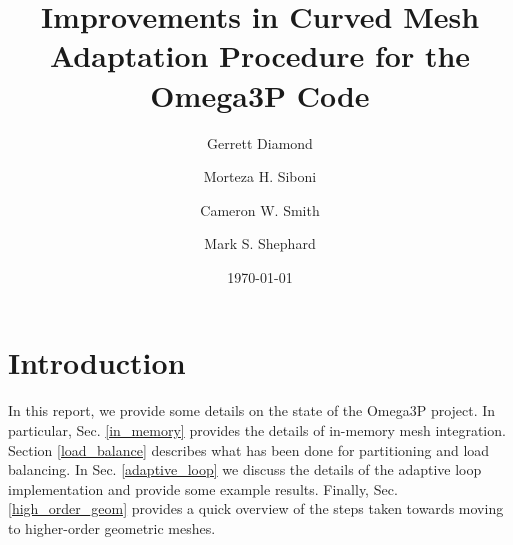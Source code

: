 \documentclass[review,12pt]{elsarticle_summary_report}
\begin{document}
\title{Improvements in Curved Mesh Adaptation Procedure for the Omega3P Code}%


\author[inst1]{Gerrett Diamond}
\author[inst1]{Morteza H. Siboni}
\author[inst1]{Cameron W. Smith}


\author[inst1]{Mark S. Shephard }
\address[inst1]{Scientific Computing Research Center, Rensselaer Polytechnique Institute,\\ Troy, NY 12180}


\date{\today}





\maketitle




\section{Introduction}
In this report, we provide some details on the state of the Omega3P project.
In particular, Sec. \ref{in_memory} provides the details of in-memory mesh integration.
Section \ref{load_balance} describes what has been done for partitioning and load balancing.
In Sec. \ref{adaptive_loop} we discuss the details of the adaptive loop implementation and provide some example results.
Finally, Sec. \ref{high_order_geom} provides a quick overview of the steps taken towards moving to higher-order geometric meshes.


\end{document}
